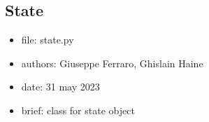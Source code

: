 \documentclass[letterpaper,10pt,english]{sphinxmanual}
\begin{document}
\subsection{State}
\label{\detokenize{scrimp:module-scrimp.state}}\label{\detokenize{scrimp:state}}\begin{itemize}
\item {} 
\sphinxAtStartPar
file:             state.py

\item {} 
\sphinxAtStartPar
authors:          Giuseppe Ferraro, Ghislain Haine

\item {} 
\sphinxAtStartPar
date:             31 may 2023

\item {} 
\sphinxAtStartPar
brief:            class for state object

\end{itemize}
\end{document}
